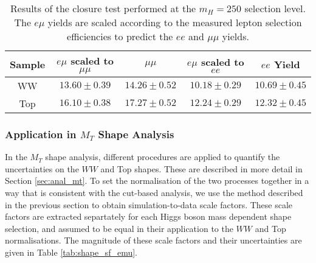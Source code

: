 \begin{table}[!ht]
\begin{center}
\begin{tabular}{c|c|c|c|c}
\hline
Sample   & $e\mu$ scaled to $\mu\mu$ & $\mu\mu$ & $e\mu$ scaled to $ee$ &  $ee$ Yield \\ \hline 
\hline
WW   & $13.60 \pm 0.39$ & $14.26 \pm 0.52$ & $10.18 \pm 0.29$ & $10.69 \pm 0.45$\\ \hline 
Top   & $16.10 \pm 0.38$ & $17.27 \pm 0.52$ & $12.24 \pm 0.29$ & $12.32 \pm 0.45$\\ \hline 
\end{tabular}
\caption{Results of the closure test performed at the $m_H=250$ selection level.
The $e\mu$ yields are scaled according to the measured lepton selection efficiencies 
to predict the $ee$ and $\mu\mu$ yields.}
\label{tab:ofmc}
\end{center}
\end{table}

\subsubsection{Application in $M_T$ Shape Analysis}

In the $M_T$ shape analysis, different procedures are applied to quantify
the uncertainties on the $WW$ and Top shapes. 
These are described in more detail in Section \ref{sec:anal_mt}.
To set the normalisation of the two processes together in a way
that is consistent with the cut-based analysis, we use the method 
described in the previous section to obtain simulation-to-data scale 
factors. These scale factors are extracted separtately for each
Higgs boson mass dependent shape selection, and assumed to be equal
in their application to the $WW$ and Top normalisations.
The magnitude of these scale factors and their uncertainties 
are given in Table \ref{tab:shape_sf_emu}.

